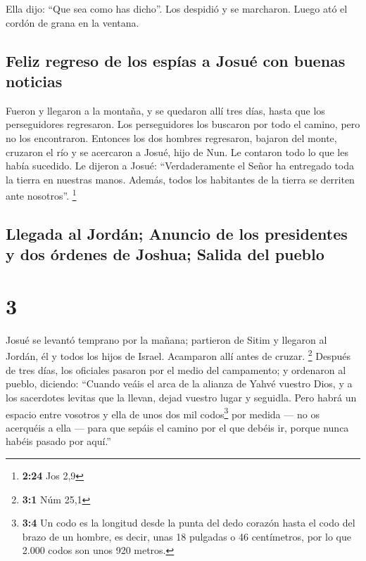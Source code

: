  Ella dijo: ``Que sea como has dicho''. Los despidió y se
marcharon. Luego ató el cordón de grana en la ventana.

\hypertarget{feliz-regreso-de-los-espuxedas-a-josuuxe9-con-buenas-noticias}{%
\subsection{Feliz regreso de los espías a Josué con buenas
noticias}\label{feliz-regreso-de-los-espuxedas-a-josuuxe9-con-buenas-noticias}}

 Fueron y llegaron a la montaña, y se quedaron allí tres
días, hasta que los perseguidores regresaron. Los perseguidores los
buscaron por todo el camino, pero no los encontraron. 
Entonces los dos hombres regresaron, bajaron del monte, cruzaron el río
y se acercaron a Josué, hijo de Nun. Le contaron todo lo que les había
sucedido.  Le dijeron a Josué: ``Verdaderamente el Señor
ha entregado toda la tierra en nuestras manos. Además, todos los
habitantes de la tierra se derriten ante nosotros''. \footnote{\textbf{2:24}
  Jos 2,9}

\hypertarget{llegada-al-jorduxe1n-anuncio-de-los-presidentes-y-dos-uxf3rdenes-de-joshua-salida-del-pueblo}{%
\subsection{Llegada al Jordán; Anuncio de los presidentes y dos órdenes
de Joshua; Salida del
pueblo}\label{llegada-al-jorduxe1n-anuncio-de-los-presidentes-y-dos-uxf3rdenes-de-joshua-salida-del-pueblo}}

\hypertarget{section-2}{%
\section{3}\label{section-2}}

 Josué se levantó temprano por la mañana; partieron de
Sitim y llegaron al Jordán, él y todos los hijos de Israel. Acamparon
allí antes de cruzar. \footnote{\textbf{3:1} Núm 25,1} 
Después de tres días, los oficiales pasaron por el medio del campamento;
 y ordenaron al pueblo, diciendo: ``Cuando veáis el arca
de la alianza de Yahvé vuestro Dios, y a los sacerdotes levitas que la
llevan, dejad vuestro lugar y seguidla.  Pero habrá un
espacio entre vosotros y ella de unos dos mil codos\footnote{\textbf{3:4}
  Un codo es la longitud desde la punta del dedo corazón hasta el codo
  del brazo de un hombre, es decir, unas 18 pulgadas o 46 centímetros,
  por lo que 2.000 codos son unos 920 metros.} por medida --- no os
acerquéis a ella --- para que sepáis el camino por el que debéis ir,
porque nunca habéis pasado por aquí.''

